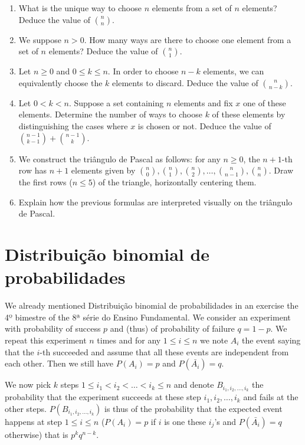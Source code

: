 \begin{enumerate}

\item What is the unique way to choose $n$ elements from a set of $n$ elements?
  Deduce the value of $\binom{n}{n}$.

\item We suppose $n > 0$. How many ways are there to choose one element from
  a set of $n$ elements? Deduce the value of $\binom{n}{1}$.

\item Let $n \geq 0$ and $0 \leq k \leq n$.
  In order to choose $n - k$ elements, we can equivalently choose the $k$
  elements to discard. Deduce the value of $\binom{n}{n - k}$.

\item Let $0 < k < n$. Suppose a set containing $n$ elements and fix
  $x$ one of these elements. Determine the number of ways to choose $k$ of
  these elements by distinguishing the cases where $x$ is chosen or not.
  Deduce the value of $\binom{n-1}{k-1} + \binom{n-1}{k}$.

\item We construct the triângulo de Pascal as follows:
  for any $n \geq 0$, the $n+1$-th row has $n+1$ elements given by
  $\binom{n}{0}, \binom{n}{1}, \binom{n}{2}, \dots, \binom{n}{n-1},
  \binom{n}{n}$.
  Draw the first rows ($n \leq 5$) of the triangle, horizontally centering them.

\item Explain how the previous formulas are interpreted visually on the
  triângulo de Pascal.

\end{enumerate}

\section{Distribuição binomial de probabilidades}

We already mentioned Distribuição binomial de probabilidades in an exercise
the 4º bimestre of the 8ª série do Ensino Fundamental. We consider an experiment
with probability of success $p$ and (thus) of probability of failure $q=1-p$.
We repeat this experiment $n$ times and for any $1 \leq i \leq n$ we note
$A_i$ the event saying that the $i$-th succeeded and assume that all these
events are independent from each other. Then we still have
$P(A_i) = p$ and $P(\bar{A_i}) = q$.

We now pick $k$ steps
$1 \leq i_1 < i_2 < \dots < i_k \leq n$ and denote $B_{i_1, i_2, \dots, i_k}$ the
probability that the experiment succeeds at these step $i_1,i_2, \dots, i_k$
and fails at the other steps. $P(B_{i_1, i_2, \dots, i_k})$ is thus
of the probability that the expected event happens at step $1 \leq i \leq n$
($P(A_i)=p$ if $i$ is one these $i_j$'s and $P(\bar{A_i})=q$ otherwise) that is
$p^k q^{n-k}$.

